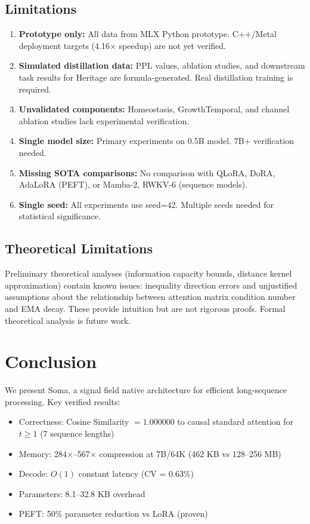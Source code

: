\documentclass[11pt]{article}
\begin{document}
\subsection{Limitations}

\begin{enumerate}
    \item \textbf{Prototype only:} All data from MLX Python prototype. C++/Metal deployment targets (4.16$\times$ speedup) are not yet verified.
    \item \textbf{Simulated distillation data:} PPL values, ablation studies, and downstream task results for Heritage are formula-generated. Real distillation training is required.
    \item \textbf{Unvalidated components:} Homeostasis, GrowthTemporal, and channel ablation studies lack experimental verification.
    \item \textbf{Single model size:} Primary experiments on 0.5B model. 7B+ verification needed.
    \item \textbf{Missing SOTA comparisons:} No comparison with QLoRA, DoRA, AdaLoRA (PEFT), or Mamba-2, RWKV-6 (sequence models).
    \item \textbf{Single seed:} All experiments use seed=42. Multiple seeds needed for statistical significance.
\end{enumerate}

\subsection{Theoretical Limitations}

Preliminary theoretical analyses (information capacity bounds, distance kernel approximation) contain known issues: inequality direction errors and unjustified assumptions about the relationship between attention matrix condition number and EMA decay. These provide intuition but are not rigorous proofs. Formal theoretical analysis is future work.

\section{Conclusion}

We present Soma, a signal field native architecture for efficient long-sequence processing. Key verified results:

\begin{itemize}
    \item Correctness: Cosine Similarity $= 1.000000$ to causal standard attention for $t \geq 1$ (7 sequence lengths)
    \item Memory: 284$\times$--567$\times$ compression at 7B/64K (462 KB vs 128--256 MB)
    \item Decode: $O(1)$ constant latency (CV = 0.63\%)
    \item Parameters: 8.1--32.8 KB overhead
    \item PEFT: 50\% parameter reduction vs LoRA (proven)
\end{itemize}
\end{document}
